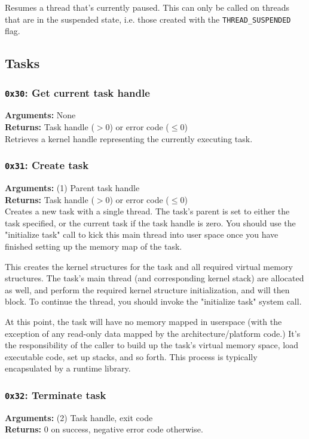 \documentclass[11pt]{article}
\begin{document}
Resumes a thread that's currently paused. This can only be called on threads that are in the suspended state, i.e. those created with the \texttt{THREAD\_SUSPENDED} flag.

\newpage
\subsection{Tasks}
\subsubsection{{\tt 0x30}: Get current task handle}
\textbf{Arguments:} None \\
\textbf{Returns:} Task handle ($>0$) or error code ($\leq0$) \\

Retrieves a kernel handle representing the currently executing task.

\subsubsection{{\tt 0x31}: Create task}
\textbf{Arguments:} (1) Parent task handle \\
\textbf{Returns:} Task handle ($>0$) or error code ($\leq0$) \\

Creates a new task with a single thread. The task's parent is set to either the task specified, or the current task if the task handle is zero. You should use the "initialize task" call to kick this main thread into user space once you have finished setting up the memory map of the task.

This creates the kernel structures for the task and all required virtual memory structures. The task's main thread (and corresponding kernel stack) are allocated as well, and perform the required kernel structure initialization, and will then block. To continue the thread, you should invoke the "initialize task" system call.

At this point, the task will have no memory mapped in userspace (with the exception of any read-only data mapped by the architecture/platform code.) It's the responsibility of the caller to build up the task's virtual memory space, load executable code, set up stacks, and so forth. This process is typically encapsulated by a runtime library.

\subsubsection{{\tt 0x32}: Terminate task}
\textbf{Arguments:} (2) Task handle, exit code \\
\textbf{Returns:} 0 on success, negative error code otherwise. \\
\end{document}
